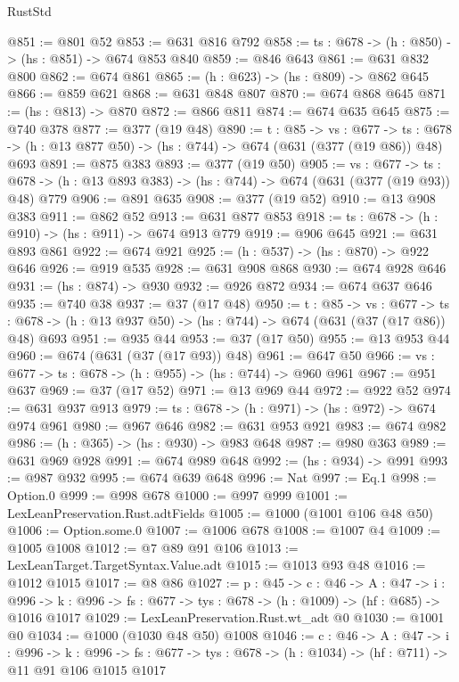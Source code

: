 \begin{lexlean}{RustStd}
\begin{coremodule}
@851 := @801 @52
@853 := @631 @816 @792
@858 := {ts : @678} -> (h : @850) -> (hs : @851) -> @674 @853 @840
@859 := @846 @643
@861 := @631 @832 @800
@862 := @674 @861
@865 := (h : @623) -> (hs : @809) -> @862 @645
@866 := @859 @621
@868 := @631 @848 @807
@870 := @674 @868 @645
@871 := (hs : @813) -> @870
@872 := @866 @811
@874 := @674 @635 @645
@875 := @740 @378
@877 := @377 (@19 @48)
@890 := {t : @85} ->
  {vs : @677} ->
  {ts : @678} -> (h : @13 @877 @50) -> (hs : @744) -> @674 (@631 (@377 (@19 @86)) @48) @693
@891 := @875 @383
@893 := @377 (@19 @50)
@905 := {vs : @677} ->
  {ts : @678} -> (h : @13 @893 @383) -> (hs : @744) -> @674 (@631 (@377 (@19 @93)) @48) @779
@906 := @891 @635
@908 := @377 (@19 @52)
@910 := @13 @908 @383
@911 := @862 @52
@913 := @631 @877 @853
@918 := {ts : @678} -> (h : @910) -> (hs : @911) -> @674 @913 @779
@919 := @906 @645
@921 := @631 @893 @861
@922 := @674 @921
@925 := (h : @537) -> (hs : @870) -> @922 @646
@926 := @919 @535
@928 := @631 @908 @868
@930 := @674 @928 @646
@931 := (hs : @874) -> @930
@932 := @926 @872
@934 := @674 @637 @646
@935 := @740 @38
@937 := @37 (@17 @48)
@950 := {t : @85} ->
  {vs : @677} ->
  {ts : @678} -> (h : @13 @937 @50) -> (hs : @744) -> @674 (@631 (@37 (@17 @86)) @48) @693
@951 := @935 @44
@953 := @37 (@17 @50)
@955 := @13 @953 @44
@960 := @674 (@631 (@37 (@17 @93)) @48)
@961 := @647 @50
@966 := {vs : @677} -> {ts : @678} -> (h : @955) -> (hs : @744) -> @960 @961
@967 := @951 @637
@969 := @37 (@17 @52)
@971 := @13 @969 @44
@972 := @922 @52
@974 := @631 @937 @913
@979 := {ts : @678} -> (h : @971) -> (hs : @972) -> @674 @974 @961
@980 := @967 @646
@982 := @631 @953 @921
@983 := @674 @982
@986 := (h : @365) -> (hs : @930) -> @983 @648
@987 := @980 @363
@989 := @631 @969 @928
@991 := @674 @989 @648
@992 := (hs : @934) -> @991
@993 := @987 @932
@995 := @674 @639 @648
@996 := Nat
@997 := Eq.{1}
@998 := Option.{0}
@999 := @998 @678
@1000 := @997 @999
@1001 := LexLeanPreservation.Rust.adtFields
@1005 := @1000 (@1001 @106 @48 @50)
@1006 := Option.some.{0}
@1007 := @1006 @678
@1008 := @1007 @4
@1009 := @1005 @1008
@1012 := @7 @89 @91 @106
@1013 := LexLeanTarget.TargetSyntax.Value.adt
@1015 := @1013 @93 @48
@1016 := @1012 @1015
@1017 := @8 @86
@1027 := {p : @45} ->
  {c : @46} ->
  {A : @47} ->
  {i : @996} ->
  {k : @996} -> {fs : @677} -> {tys : @678} -> (h : @1009) -> (hf : @685) -> @1016 @1017
@1029 := LexLeanPreservation.Rust.wt_adt @0
@1030 := @1001 @0
@1034 := @1000 (@1030 @48 @50) @1008
@1046 := {c : @46} ->
  {A : @47} ->
  {i : @996} ->
  {k : @996} ->
  {fs : @677} -> {tys : @678} -> (h : @1034) -> (hf : @711) -> @11 @91 @106 @1015 @1017

\end{coremodule}
\end{lexlean}

